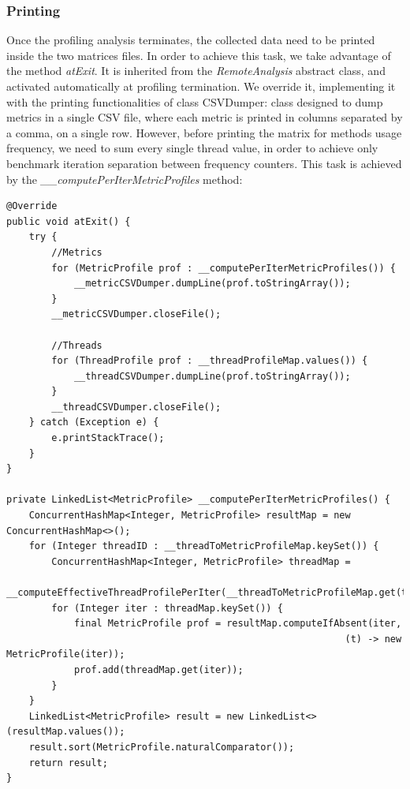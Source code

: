 \documentclass[]{usiinfthesis}
\begin{document}
    \subsubsection{Printing}
    Once the profiling analysis terminates, the collected data need to be printed inside the two matrices files. In order to achieve this task, we take advantage of the method \textit{atExit}. It is inherited from the \textit{RemoteAnalysis} abstract class, and activated automatically at profiling termination. We override it, implementing it with the printing functionalities of class CSVDumper: class designed to dump metrics in a single CSV file, where each metric is printed in columns separated by a comma, on a single row. However, before printing the matrix for methods usage frequency, we need to sum every single thread value, in order to achieve only benchmark iteration separation between frequency counters. This task is achieved by the \textit{\_\_computePerIterMetricProfiles} method:
    \vspace*{0.25cm}
        \begin{verbatim}
@Override
public void atExit() {
    try {
        //Metrics
        for (MetricProfile prof : __computePerIterMetricProfiles()) {
            __metricCSVDumper.dumpLine(prof.toStringArray());
        }
        __metricCSVDumper.closeFile();

        //Threads
        for (ThreadProfile prof : __threadProfileMap.values()) {
            __threadCSVDumper.dumpLine(prof.toStringArray());
        }
        __threadCSVDumper.closeFile();
    } catch (Exception e) {
        e.printStackTrace();
    }
}

private LinkedList<MetricProfile> __computePerIterMetricProfiles() {
    ConcurrentHashMap<Integer, MetricProfile> resultMap = new ConcurrentHashMap<>();
    for (Integer threadID : __threadToMetricProfileMap.keySet()) {
        ConcurrentHashMap<Integer, MetricProfile> threadMap =
        __computeEffectiveThreadProfilePerIter(__threadToMetricProfileMap.get(threadID));
        for (Integer iter : threadMap.keySet()) {
            final MetricProfile prof = resultMap.computeIfAbsent(iter,  
                                                            (t) -> new MetricProfile(iter));
            prof.add(threadMap.get(iter));
        }
    }
    LinkedList<MetricProfile> result = new LinkedList<>(resultMap.values());
    result.sort(MetricProfile.naturalComparator());
    return result;
}
    \end{verbatim}
    
\end{document}
